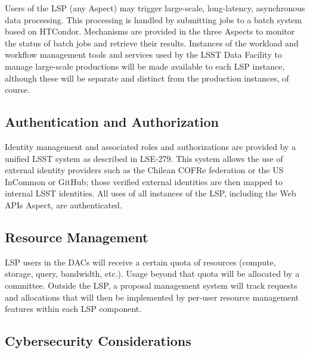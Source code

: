 Users of the LSP (any Aspect) may trigger large-scale, long-latency,
asynchronous data processing.  This processing is handled by submitting jobs to
a batch system based on HTCondor.  Mechanisms are provided in the three Aspects
to monitor the status of batch jobs and retrieve their results.  Instances of
the workload and workflow management tools and services used by the LSST Data
Facility to manage large-scale productions will be made available to each LSP
instance, although these will be separate and distinct from the production
instances, of course.

\subsection{Authentication and Authorization}\label{authentication-and-authorization}

Identity management and associated roles and authorizations are provided by a
unified LSST system as described in LSE-279.  This system allows the use of
external identity providers such as the Chilean COFRe federation \citep{COFRe}
or the US InCommon \citep{InCommon} or GitHub; those verified external
identities are then mapped to internal LSST identities.  All uses of all
instances of the LSP, including the Web APIs Aspect, are authenticated.

\subsection{Resource Management}\label{resource-management}

LSP users in the DACs will receive a certain quota of resources (compute,
storage, query, bandwidth, etc.).  Usage beyond that quota will be allocated by
a committee.  Outside the LSP, a proposal management system will track requests
and allocations that will then be implemented by per-user resource management
features within each LSP component.

\subsection{Cybersecurity Considerations}\label{cybersecurity-considerations}

